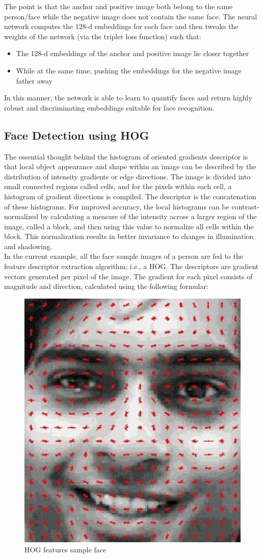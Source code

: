     The point is that the anchor and positive image both belong to the same person/face while the negative image does not contain the same face. The neural network computes the 128-d 
    embeddings for each face and then tweaks the weights of the network (via the triplet loss function) such that:
    \begin{itemize}
        \item The 128-d embeddings of the anchor and positive image lie closer together
        \item While at the same time, pushing the embeddings for the negative image father away
    \end{itemize}
    In this manner, the network is able to learn to quantify faces and return highly robust and discriminating embeddings suitable for face recognition.
    \subsection{Face Detection using HOG}
    The essential thought behind the histogram of oriented gradients descriptor is that local object appearance and shape within an image can be described by the distribution of intensity gradients or edge directions. 
    The image is divided into small connected regions called cells, and for the pixels within each cell, a histogram of gradient directions is compiled. The descriptor is the concatenation of these histograms. For 
    improved accuracy, the local histograms can be contrast-normalized by calculating a measure of the intensity across a larger region of the image, called a block, and then using this value to normalize all cells within the block. This normalization results in better invariance to changes in illumination and shadowing. \\
        \vspace{3mm}
        In the current example, all the face sample images of a person are fed to the feature descriptor extraction algorithm; i.e., a HOG. The descriptors are gradient vectors generated per pixel of the image. 
        The gradient for each pixel consists of magnitude and direction, calculated using the following formular:
        \begin{figure}[H]
            \centering
            \includegraphics[width=0.6\linewidth]{img/HOG-feature.jpg}
            \caption{HOG features sample face}
        \end{figure}
